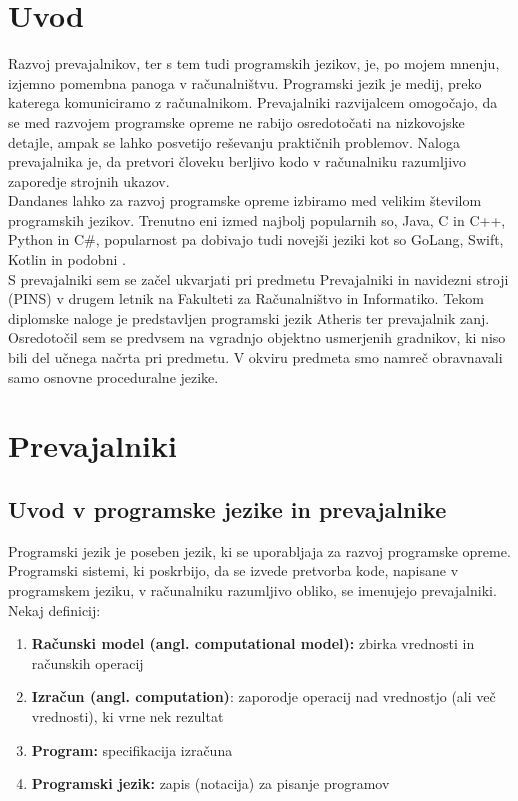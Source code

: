 \documentclass[a4paper, 12p]{book}
\begin{document}
\chapter{Uvod}

Razvoj prevajalnikov, ter s tem tudi programskih jezikov, je, po mojem mnenju, izjemno pomembna panoga v računalništvu. Programski jezik je medij, preko katerega komuniciramo z računalnikom. Prevajalniki razvijalcem omogočajo, da se med razvojem programske opreme ne rabijo osredotočati na nizkovojske detajle, ampak se lahko posvetijo reševanju praktičnih problemov. Naloga prevajalnika je, da pretvori človeku berljivo kodo v računalniku razumljivo zaporedje strojnih ukazov. \\
\indent Dandanes lahko za razvoj programske opreme izbiramo med velikim številom programskih jezikov. Trenutno eni izmed najbolj popularnih so, Java, C in C++, Python in C\#, popularnost pa dobivajo tudi novejši jeziki kot so GoLang, Swift, Kotlin in podobni \cite{tiobeIndex}. \\
\indent S prevajalniki sem se začel ukvarjati pri predmetu Prevajalniki in navidezni stroji (PINS) v drugem letnik na Fakulteti za Računalništvo in Informatiko. Tekom diplomske naloge je predstavljen programski jezik Atheris ter prevajalnik zanj. Osredotočil sem se predvsem na vgradnjo objektno usmerjenih gradnikov, ki niso bili del učnega načrta pri predmetu. V okviru predmeta smo namreč obravnavali samo osnovne proceduralne jezike. 

\chapter{Prevajalniki}
\label{ch0}

\section{Uvod v  programske jezike in prevajalnike}

Programski jezik je poseben jezik, ki se uporabljaja za razvoj programske opreme. Programski sistemi, ki poskrbijo, da se izvede pretvorba kode, napisane v programskem jeziku, v računalniku razumljivo obliko, se imenujejo prevajalniki. \\
Nekaj definicij:
\begin{enumerate}  
	\item \textbf{Računski model (angl. computational model):} zbirka vrednosti in računskih operacij 
	\item \textbf{Izračun (angl. computation)}: zaporodje operacij nad vrednostjo (ali več vrednosti), ki vrne nek rezultat
	\item \textbf{Program:} specifikacija izračuna
	\item \textbf{Programski jezik:} zapis (notacija) za pisanje programov
\end{enumerate}
\end{document}
